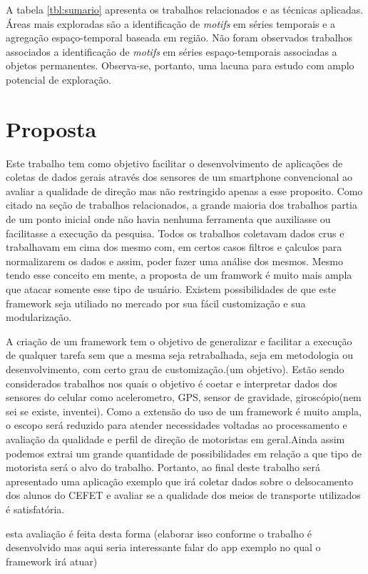 \documentclass[12pt]{report} %
\begin{document}
A tabela \ref{tbl:sumario} apresenta os trabalhos relacionados e as técnicas aplicadas. Áreas mais exploradas são a identificação de \emph{motifs} em séries temporais e a agregação espaço-temporal baseada em região. Não foram observados trabalhos associados a identificação de \emph{motifs} em séries espaço-temporais associadas a objetos permanentes. Observa-se, portanto, uma lacuna para estudo com amplo potencial de exploração.

\chapter{Proposta} 
\label{sec:proposta}
Este trabalho tem como objetivo facilitar o desenvolvimento de aplicações de coletas de dados gerais através dos sensores de um smartphone convencional ao avaliar a qualidade de direção mas não restringido apenas a esse proposito. Como citado na seção de trabalhos relacionados, a grande maioria dos trabalhos partia de um ponto inicial onde não havia nenhuma ferramenta que auxiliasse ou facilitasse a execução da pesquisa. Todos os trabalhos coletavam dados crus e trabalhavam em cima dos mesmo com, em certos casos filtros e çalculos para normalizarem os dados e assim, poder fazer uma análise dos mesmos. Mesmo tendo esse conceito em mente, a proposta de um framwork é muito mais ampla que atacar somente esse tipo de usuário. Existem possibilidades de que este framework seja utiliado no mercado por sua fácil customização e sua modularização.

A criação de um framework tem o objetivo de generalizar e facilitar a execução de qualquer tarefa sem que a mesma seja retrabalhada, seja em metodologia ou desenvolvimento, com certo grau de customização.(um objetivo). Estão sendo considerados trabalhos nos quais o objetivo é coetar e interpretar dados dos sensores do celular como acelerometro, GPS, sensor de gravidade, giroscópio(nem sei se existe, inventei). Como a extensão do uso de um framework é muito ampla, o escopo será reduzido para atender necessidades voltadas ao processamento e avaliação da qualidade e perfil de direção de motoristas em geral.Ainda assim podemos extrai um grande quantidade de possibilidades em relação a que tipo de motorista será o alvo do trabalho. Portanto, ao final deste trabalho será apresentado uma aplicação exemplo que irá coletar dados sobre o delsocamento dos alunos do CEFET e avaliar se a qualidade dos meios de transporte utilizados é satisfatória. 

esta avaliação é feita desta forma (elaborar isso conforme o trabalho é desenvolvido mas aqui seria interessante falar do app exemplo no qual o framework irá atuar)
\end{document}
